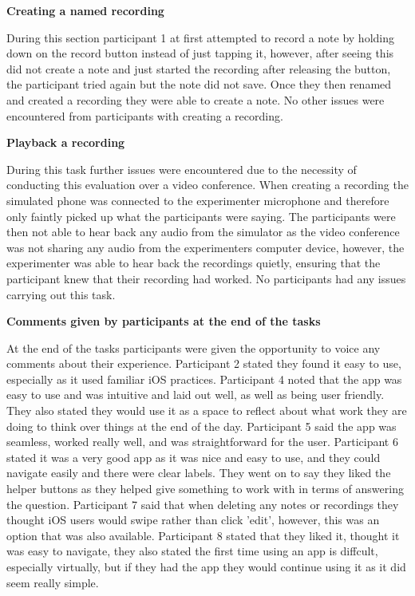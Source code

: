 \documentclass{l4proj}
\begin{document}
\textbf{Creating a named recording}

During this section participant 1 at first attempted to record a note by holding down on the record button instead of just tapping it, however, after seeing this did not create a note and just started the recording after releasing the button, the participant tried again but the note did not save. Once they then renamed and created a recording they were able to create a note. No other issues were encountered from participants with creating a recording.

\textbf{Playback a recording}

During this task further issues were encountered due to the necessity of conducting this evaluation over a video conference. When creating a recording the simulated phone was connected to the experimenter microphone and therefore only faintly picked up what the participants were saying. The participants were then not able to hear back any audio from the simulator as the video conference was not sharing any audio from the experimenters computer device, however, the experimenter was able to hear back the recordings quietly, ensuring that the participant knew that their recording had worked. No participants had any issues carrying out this task.

\textbf{Comments given by participants at the end of the tasks}

At the end of the tasks participants were given the opportunity to voice any comments about their experience. Participant 2 stated they found it easy to use, especially as it used familiar iOS practices. Participant 4 noted that the app was easy to use and was intuitive and laid out well, as well as being user friendly. They also stated they would use it as a space to reflect about what work they are doing to think over things at the end of the day. Participant 5 said the app was seamless, worked really well, and was straightforward for the user. Participant 6 stated it was a very good app as it was nice and easy to use, and they could navigate easily and there were clear labels. They went on to say they liked the helper buttons as they helped give something to work with in terms of answering the question. Participant 7 said that when deleting any notes or recordings they thought iOS users would swipe rather than click 'edit', however, this was an option that was also available. Participant 8 stated that they liked it, thought it was easy to navigate, they also stated the first time using an app is diffcult, especially virtually, but if they had the app they would continue using it as it did seem really simple.
\end{document}
